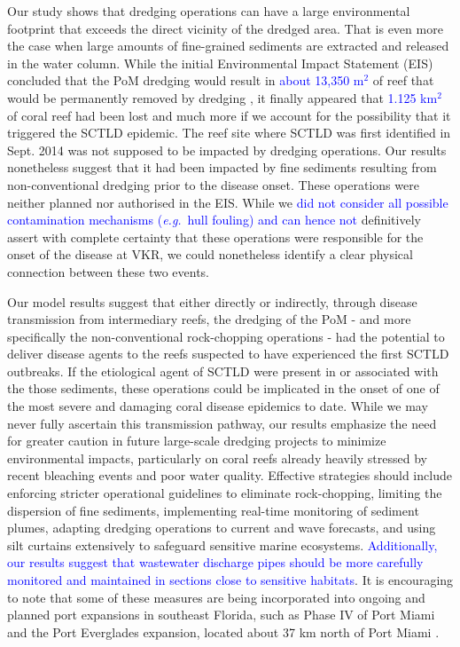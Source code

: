 \documentclass[preprint,12pt,authoryear]{elsarticle}
\newcommand{\modif}[1]{\textcolor{blue}{#1}}
\begin{document}
Our study shows that dredging operations can have a large environmental footprint that exceeds the direct vicinity of the dredged area. That is even more the case when large amounts of fine-grained sediments are extracted and released in the water column. While the initial Environmental Impact Statement (EIS) concluded that the PoM dredging would result in \modif{about 13,350 m$^{2}$} of reef that would be permanently removed by dredging \citep{USACE2004}, it finally appeared that \modif{1.125 km$^{2}$} of coral reef had been lost \cite{noaa2023sedimentation} and much more if we account for the possibility that it triggered the SCTLD epidemic. The reef site where SCTLD was first identified in Sept. 2014 was not supposed to be impacted by dredging operations. Our results nonetheless suggest that it had been impacted by fine sediments resulting from non-conventional dredging prior to the disease onset. These operations were neither planned nor authorised in the EIS. While we \modif{did not consider all possible contamination mechanisms (\textit{e.g.}~hull fouling) and can hence not} definitively assert with complete certainty that these operations were responsible for the onset of the disease at VKR, we could nonetheless identify a clear physical connection between these two events.

Our model results suggest that either directly or indirectly, through disease transmission from intermediary reefs, the dredging of the PoM - and more specifically the non-conventional rock-chopping operations - had the potential to deliver disease agents to the reefs suspected to have experienced the first SCTLD outbreaks. If the etiological agent of SCTLD were present in or associated with the those sediments, these operations could be implicated in the onset of one of the most severe and damaging coral disease epidemics to date. While we may never fully ascertain this transmission pathway, our results emphasize the need for greater caution in future large-scale dredging projects to minimize environmental impacts, particularly on coral reefs already heavily stressed by recent bleaching events and poor water quality. Effective strategies should include enforcing stricter operational guidelines to eliminate rock-chopping, limiting the dispersion of fine sediments, implementing real-time monitoring of sediment plumes, adapting dredging operations to current and wave forecasts, and using silt curtains extensively to safeguard sensitive marine ecosystems. \modif{Additionally, our results suggest that wastewater discharge pipes should be more carefully monitored and maintained in sections close to sensitive habitats}. It is encouraging to note that some of these measures are being incorporated into ongoing and planned port expansions in southeast Florida, such as Phase IV of Port Miami and the Port Everglades expansion, located about 37 km north of Port Miami \cite{noaa2023sedimentation}.
\end{document}
